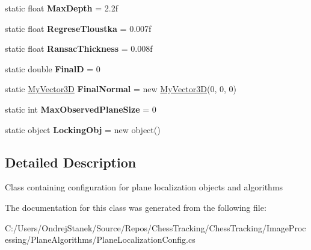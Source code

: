 \begin{DoxyCompactItemize}
static float {\bfseries Max\+Depth} = 2.\+2f
\item 
\mbox{\label{class_chess_tracking_1_1_image_processing_1_1_plane_algorithms_1_1_plane_localization_config_a4bb9caea6fec387a932603bdc59538db}} 
static float {\bfseries Regrese\+Tloustka} = 0.\+007f
\item 
\mbox{\label{class_chess_tracking_1_1_image_processing_1_1_plane_algorithms_1_1_plane_localization_config_a9f30621e8f4d5a2f53f56ee19f6db7af}} 
static float {\bfseries Ransac\+Thickness} = 0.\+008f
\item 
\mbox{\label{class_chess_tracking_1_1_image_processing_1_1_plane_algorithms_1_1_plane_localization_config_a65e4c2b4735db56353cd00ad43463376}} 
static double {\bfseries FinalD} = 0
\item 
\mbox{\label{class_chess_tracking_1_1_image_processing_1_1_plane_algorithms_1_1_plane_localization_config_a7eb0ca5e759b9e8d95f7aa0db6ce08c1}} 
static \mbox{\hyperlink{class_chess_tracking_1_1_utils_1_1_my_vector3_d}{My\+Vector3D}} {\bfseries Final\+Normal} = new \mbox{\hyperlink{class_chess_tracking_1_1_utils_1_1_my_vector3_d}{My\+Vector3D}}(0, 0, 0)
\item 
\mbox{\label{class_chess_tracking_1_1_image_processing_1_1_plane_algorithms_1_1_plane_localization_config_af13285dc6673ef93b99a0f5ed1f96951}} 
static int {\bfseries Max\+Observed\+Plane\+Size} = 0
\item 
\mbox{\label{class_chess_tracking_1_1_image_processing_1_1_plane_algorithms_1_1_plane_localization_config_a5f4d4cc03fd65fd4933f7265289c67f3}} 
static object {\bfseries Locking\+Obj} = new object()
\end{DoxyCompactItemize}


\subsection{Detailed Description}
Class containing configuration for plane localization objects and algorithms 



The documentation for this class was generated from the following file\+:\begin{DoxyCompactItemize}
\item 
C\+:/\+Users/\+Ondrej\+Stanek/\+Source/\+Repos/\+Chess\+Tracking/\+Chess\+Tracking/\+Image\+Processing/\+Plane\+Algorithms/Plane\+Localization\+Config.\+cs\end{DoxyCompactItemize}
